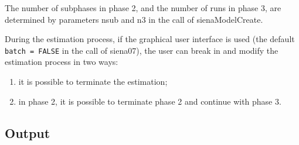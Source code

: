 \documentclass[a4paper,fleqn,11pt]{article}
\newcommand{\+}{\, + \,}
\begin{document}
The number of subphases in phase 2, and the number of runs in
phase 3, are determined by parameters \textsf{nsub} and \textsf{n3}
in the call of \textsf{sienaModelCreate}.

During the estimation process, if the graphical user interface
is used (the default \\
\texttt{batch = FALSE} in the call of \textsf{siena07}),
the user can break in and modify the estimation process in two
ways:
\begin{enumerate}
\item it is possible to terminate the estimation;
\item in phase 2, it is possible to terminate phase 2
      and continue with phase 3.
\end{enumerate}



\subsection{Output}
\label{S_output}
\end{document}
